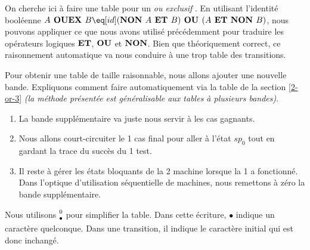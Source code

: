 On cherche ici à faire une table pour un \emph{\og ou exclusif \fg}.
En utilisant l'identité booléenne $A \boolope{ OUEX } B \eq[id] (\boolope{NON } A \boolope{ ET } B) \boolope{ OU } (A \boolope{ ET NON } B)$, nous pouvons appliquer ce que nous avons utilisé précédemment pour traduire les opérateurs logiques $\text{\bfseries ET}$, $\text{\bfseries OU}$ et $\text{\bfseries NON}$.
Bien que théoriquement correct, ce raisonnement automatique va nous conduire à une trop  table des transitions.


\medskip


Pour obtenir une table de taille raisonnable, nous allons ajouter une nouvelle bande.
Expliquons comment faire automatiquement via la table  de la section \ref{2-or-3} \emph{(la méthode présentée est généralisable aux tables à plusieurs bandes)}.
\begin{enumerate}
    \item La bande supplémentaire va juste nous servir à  les cas gagnants.

    \item Nous allons court-circuiter le 1\ier{} cas final pour aller à l'état $sp_0$  tout en gardant la trace du succès du 1\ier{} test.

    \item Il reste à gérer les états bloquants de la 2\ieme{} machine lorsque la 1\iere{} a fonctionné.
          Dans l'optique d'utilisation séquentielle de machines, nous remettons à zéro la bande supplémentaire.
\end{enumerate}


\medskip

Nous utilisons ${\scriptsize\begin{matrix}0\\\bullet\end{matrix}}$ pour simplifier la table. Dans cette écriture, {\scriptsize$\bullet$} indique un caractère quelconque. Dans une transition, il indique le caractère initial qui est donc inchangé.


